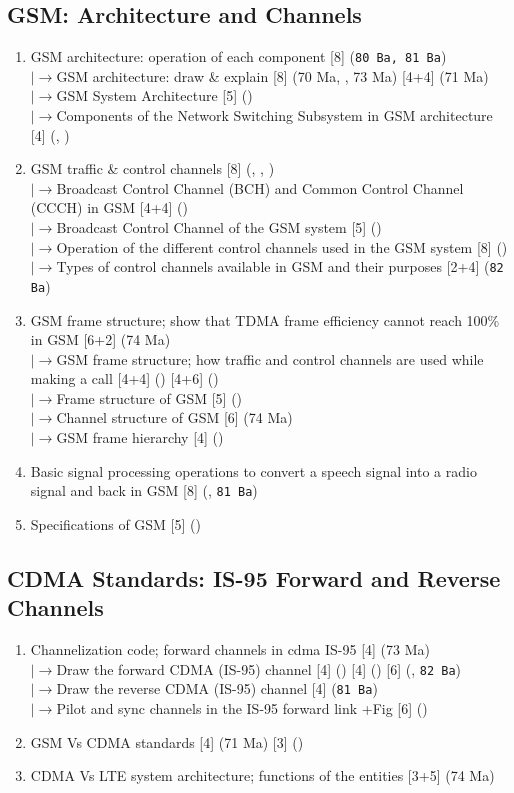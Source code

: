 \documentclass[12pt]{article}
\newcommand{\lb}{\\$\left|\rightarrow\right.$}
\begin{document}
  \subsection{GSM: Architecture and Channels}
    \begin{enumerate}[topsep=0pt, noitemsep]
      \item GSM architecture: operation of each component \hfill [8] (\texttt{80 Ba, 81 Ba})
        \lb GSM architecture: draw \& explain \hfill [8] (70 Ma, , 73 Ma) [4+4] (71 Ma)
        \lb GSM System Architecture \hfill [5] ()
        \lb Components of the Network Switching Subsystem in GSM architecture \hfill [4] (, )
      \item GSM traffic \& control channels \hfill [8] (, , )
        \lb Broadcast Control Channel (BCH) and Common Control Channel (CCCH) in GSM \hfill [4+4] ()
        \lb Broadcast Control Channel of the GSM system \hfill [5] ()
        \lb Operation of the different control channels used in the GSM system \hfill [8] ()
        \lb Types of control channels available in GSM and their purposes \hfill [2+4] (\texttt{82 Ba})
      \item GSM frame structure; show that TDMA frame efficiency cannot reach 100\% in GSM \hfill [6+2] (74 Ma)
        \lb GSM frame structure; how traffic and control channels are used while making a call
        \hfill [4+4] () [4+6] ()
        \lb Frame structure of GSM \hfill [5] ()
        \lb Channel structure of GSM \hfill [6] (74 Ma)
        \lb GSM frame hierarchy \hfill [4] ()
      \item Basic signal processing operations to convert a speech signal into a radio signal
        and back in GSM \hfill [8] (, \texttt{81 Ba})
      \item Specifications of GSM \hfill [5] ()
    \end{enumerate}

  \subsection{CDMA Standards: IS-95 Forward and Reverse Channels}
    \begin{enumerate}[topsep=0pt, noitemsep]
      \item Channelization code; forward channels in cdma IS-95 \hfill [4] (73 Ma)
        \lb Draw the forward CDMA (IS-95) channel \hfill [4] () [4] () [6] (, \texttt{82 Ba})
        \lb Draw the reverse CDMA (IS-95) channel \hfill [4] (\texttt{81 Ba})
        \lb Pilot and sync channels in the IS-95 forward link +Fig \hfill [6] ()
      \item GSM Vs CDMA standards \hfill [4] (71 Ma) [3] ()
      \item CDMA Vs LTE system architecture; functions of the entities \hfill [3+5] (74 Ma)
    \end{enumerate}
\end{document}
